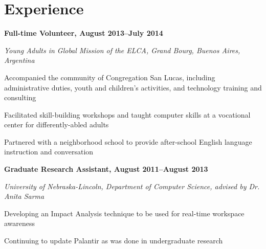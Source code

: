 \documentclass[10pt,letterpaper]{article}
\renewenvironment{itemize}{
  \begin{list}{}{
    \setlength{\leftmargin}{1.5em}
    \setlength{\itemsep}{0.25em}
    \setlength{\parskip}{0pt}
    \setlength{\parsep}{0.25em}
  }
}{
  \end{list}
}
\begin{document}
\section*{Experience}


\begin{itemize}
\item \textbf{Full-time Volunteer, August 2013--July 2014}
\item \emph{Young Adults in Global Mission of the ELCA, Grand Bourg, Buenos Aires, Argentina}
	\begin{itemize}
    \item Accompanied the community of Congregation San Lucas, including
    administrative duties, youth and children's activities, and technology
    training and consulting
    \item Facilitated skill-building workshops and taught computer skills at
    a vocational center for differently-abled adults
    \item Partnered with a neighborhood school to provide after-school
    English language instruction and conversation
	\end{itemize}
\end{itemize}

\begin{itemize}
\item \textbf{Graduate Research Assistant, August 2011--August 2013}
\item \emph{University of Nebraska-Lincoln, Department of Computer Science, advised by Dr. Anita Sarma}
	\begin{itemize}
	\item Developing an Impact Analysis technique to be used for real-time workspace awareness
	\item Continuing to update Palantir as was done in undergraduate research
	\end{itemize}
\end{itemize}

\begin{comment}
\begin{itemize}
\item \textbf{Host and Fellowship Coordinator, August 2012--July 2013}
\item \emph{Lutheran Student Center (ELCA), University of Nebraska-Lincoln}
    \begin{itemize}
    \item Clean and maintain the Lutheran Student Center building
    \item Engage students with fun fellowship opportunities such as movie nights and pool leagues
    \end{itemize}
\end{itemize}
\end{comment}
\end{document}
